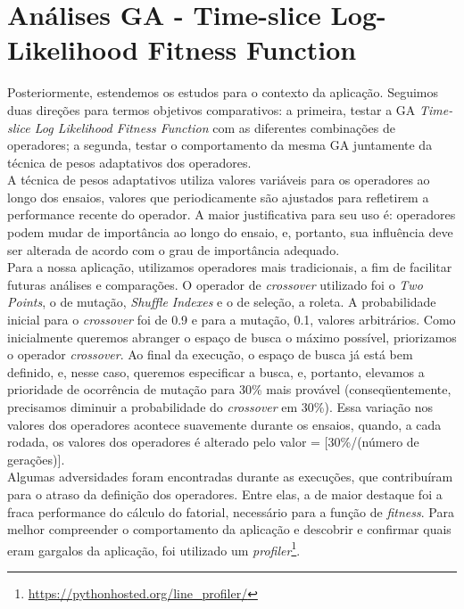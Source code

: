 \section{Análises GA - Time-slice Log-Likelihood Fitness Function}
Posteriormente, estendemos os estudos para o contexto da aplicação. Seguimos duas direções para termos objetivos comparativos: a primeira, testar a GA {\it Time-slice Log Likelihood Fitness Function} com as diferentes combinações de operadores; a segunda, testar o comportamento da mesma GA juntamente da técnica de pesos adaptativos dos operadores.\\

A técnica de pesos adaptativos utiliza valores variáveis para os operadores ao longo dos ensaios, valores que periodicamente são ajustados para refletirem a performance recente do operador. A maior justificativa para seu uso é: operadores podem mudar de importância ao longo do ensaio, e, portanto, sua influência deve ser alterada de acordo com o grau de importância adequado.\\ %

Para a nossa aplicação, utilizamos operadores mais tradicionais, a fim de facilitar futuras análises e comparações. O operador de {\it crossover} utilizado foi o  {\it Two Points}, o de mutação, {\it Shuffle Indexes} e o de seleção, a roleta. A probabilidade inicial para o {\it crossover} foi de 0.9 e para a mutação, 0.1, valores arbitrários. Como inicialmente queremos abranger o espaço de busca o máximo possível, priorizamos o operador {\it crossover}. Ao final da execução, o espaço de busca já está bem definido, e, nesse caso, queremos especificar a busca, e, portanto, elevamos a prioridade de ocorrência de mutação para 30\% mais provável (conseqüentemente, precisamos diminuir a probabilidade do {\it crossover} em 30\%). Essa variação nos valores dos operadores acontece suavemente durante os ensaios, quando, a cada rodada, os valores dos operadores é alterado pelo valor = [30\%/(número de gerações)].\\



Algumas adversidades foram encontradas durante as execuções, que contribuíram para o atraso da definição dos operadores. Entre elas, a de maior destaque foi a fraca performance do cálculo do fatorial, necessário para a função de {\it fitness}. Para melhor compreender o comportamento da aplicação e descobrir e confirmar quais eram gargalos da aplicação, foi utilizado um {\it profiler}\footnote[7]{\url {https://pythonhosted.org/line_profiler/}}.\\

